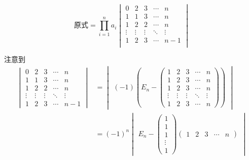 \begin{solution}
    \[ \text{原式}=\prod_{i=1}^na_i \begin{vmatrix}
            0      & 2      & 3      & \cdots & n      \\
            1      & 1      & 3      & \cdots & n      \\
            1      & 2      & 2      & \cdots & n      \\
            \vdots & \vdots & \vdots & \ddots & \vdots \\
            1      & 2      & 3      & \cdots & n-1    \\
        \end{vmatrix} \]

    注意到
    \begin{align*}
        \begin{vmatrix}
            0      & 2      & 3      & \cdots & n      \\
            1      & 1      & 3      & \cdots & n      \\
            1      & 2      & 2      & \cdots & n      \\
            \vdots & \vdots & \vdots & \ddots & \vdots \\
            1      & 2      & 3      & \cdots & n-1
        \end{vmatrix}
         & = \begin{vmatrix}(-1)\left(E_n-\begin{pmatrix}
                1      & 2      & 3      & \cdots & n      \\
                1      & 2      & 3      & \cdots & n      \\
                1      & 2      & 3      & \cdots & n      \\
                \vdots & \vdots & \vdots & \ddots & \vdots \\
                1      & 2      & 3      & \cdots & n
            \end{pmatrix}\right)\end{vmatrix} \\
         & =(-1)^n\begin{vmatrix}E_n-
                      \begin{pmatrix}
                1 \\1\\1\\\vdots\\1
            \end{pmatrix}\begin{pmatrix}1 & 2 & 3 & \cdots & n\end{pmatrix}\end{vmatrix}
    \end{align*}


\end{solution}
